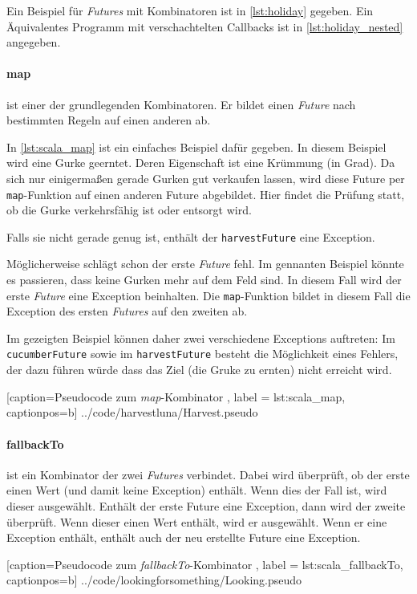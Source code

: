 Ein Beispiel für \emph{Futures} mit Kombinatoren ist in \ref{lst:holiday}
gegeben. Ein Äquivalentes Programm mit verschachtelten Callbacks
ist in \ref{lst:holiday_nested} angegeben.

\paragraph{map} ist einer der grundlegenden Kombinatoren. Er bildet
einen \emph{Future} nach bestimmten Regeln auf einen anderen ab.

In \ref{lst:scala_map} ist ein einfaches Beispiel dafür gegeben.
In diesem Beispiel wird eine Gurke geerntet. Deren Eigenschaft ist eine
Krümmung (in Grad). Da sich nur einigermaßen gerade
Gurken gut verkaufen lassen, wird diese Future per \texttt{map}-Funktion
auf einen anderen Future abgebildet. Hier findet die Prüfung statt, ob
die Gurke verkehrsfähig ist oder entsorgt wird.

Falls sie nicht gerade genug ist, enthält der \texttt{harvestFuture}
eine Exception.

Möglicherweise schlägt schon der erste \emph{Future} fehl. Im gennanten
Beispiel könnte es passieren, dass keine Gurken mehr auf dem Feld sind.
In diesem Fall wird der erste \emph{Future} eine Exception beinhalten.
Die \texttt{map}-Funktion bildet in diesem Fall die Exception des
ersten \emph{Futures} auf den zweiten ab.

Im gezeigten Beispiel können daher zwei verschiedene Exceptions auftreten:
Im \texttt{cucumberFuture} sowie im \texttt{harvestFuture} besteht
die Möglichkeit eines Fehlers, der dazu führen würde dass das Ziel
(die Gruke zu ernten) nicht erreicht wird.


    [caption={Pseudocode zum \emph{map}-Kombinator },
       label = lst:scala_map,
       captionpos=b]
 {../code/harvestluna/Harvest.pseudo}
 
\paragraph{fallbackTo} ist ein Kombinator der zwei \emph{Futures}
verbindet. Dabei wird überprüft, ob der erste einen Wert (und damit
keine Exception) enthält. Wenn dies der Fall ist, wird dieser ausgewählt.
Enthält der erste Future eine Exception, dann wird der zweite überprüft.
Wenn dieser einen Wert enthält, wird er ausgewählt. Wenn er eine
Exception enthält, enthält auch der neu erstellte Future eine Exception.


    [caption={Pseudocode zum \emph{fallbackTo}-Kombinator },
       label = lst:scala_fallbackTo,
       captionpos=b]
 {../code/lookingforsomething/Looking.pseudo}
 

